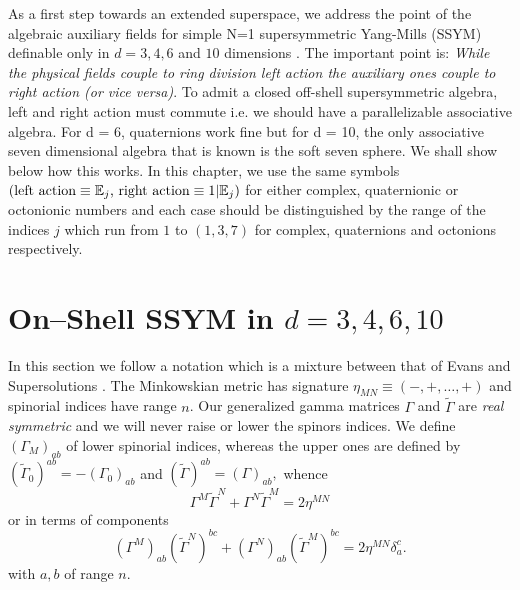 \documentclass[a4paper,12pt]{book}
\begin{document}
As a first step towards an extended superspace, we address the point of the
algebraic auxiliary fields for simple N=1 supersymmetric Yang-Mills (SSYM)
definable only in $d=3,4,6$ and $10$ dimensions \cite{r0}. The important
point is: \emph{While the physical fields couple to ring division left
action the auxiliary ones couple to right action (or vice versa)}. To admit
a closed off-shell supersymmetric algebra, left and right action must
commute i.e. we should have a parallelizable associative algebra. For d = 6,
quaternions work fine but for d = 10, the only associative seven dimensional
algebra that is known is the soft seven sphere. We shall show below how this
works. In this chapter, we use the same symbols $\left( \mbox{left action}%
\equiv \Bbb{E}_{j}\mbox{,
right action}\equiv 1|\Bbb{E}_{j}\right) $ for either complex, quaternionic
or octonionic numbers and each case should be distinguished by the range of
the indices $j$ which run from $1$ to $\left( 1,3,7\right) $ for complex,
quaternions and octonions respectively.

\section{On--Shell SSYM in $d=3,4,6,10$}

In this section we follow a notation which is a mixture between that of
Evans \cite{r4}\cite{r6} and Supersolutions \cite{supersol}. The Minkowskian
metric has signature $\eta _{MN}\equiv \left( -,+,\ldots ,+\right) $ and
spinorial indices have range $n$. Our generalized gamma matrices $\Gamma $
and $\tilde{\Gamma}$ are \emph{real symmetric} and we will never raise or
lower the spinors indices. We define $\left( \Gamma _{M}\right) _{ab}$ of
lower spinorial indices, whereas the upper ones are defined by $\left( 
\tilde{\Gamma}_{0}\right) ^{ab}=-\left( \Gamma _{0}\right) _{ab}$ and $%
\left( \tilde{\Gamma}\right) ^{ab}=\left( \Gamma \right) _{ab},$ whence 
\[
\Gamma ^{M}\tilde{\Gamma}^{N}+\Gamma ^{N}\tilde{\Gamma}^{M}=2\eta ^{MN} 
\]
or in terms of components 
\begin{equation}
\left( \Gamma ^{M}\right) _{ab}\left( \tilde{\Gamma}^{N}\right) ^{bc}+\left(
\Gamma ^{N}\right) _{ab}\left( \tilde{\Gamma}^{M}\right) ^{bc}=2\eta
^{MN}\delta _{a}^{c}.
\end{equation}
with $a,b$ of range $n$.
\end{document}
